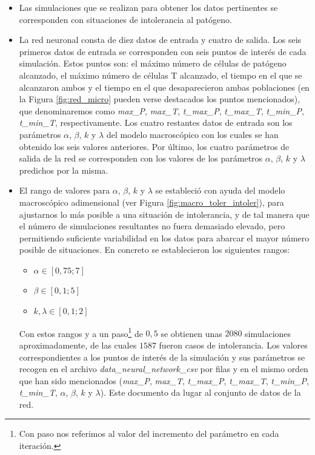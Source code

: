 \begin{itemize}
	\item Las simulaciones que se realizan para obtener los datos pertinentes se corresponden con situaciones de intolerancia al patógeno.
	
	\item La red neuronal consta de diez datos de entrada y cuatro de salida. Los seis primeros datos de entrada se corresponden con seis puntos de interés de cada simulación. Estos puntos son: el máximo número de células de patógeno alcanzado, el máximo número de células T alcanzado, el tiempo en el que se alcanzaron ambos y el tiempo en el que desaparecieron ambas poblaciones (en la Figura \ref{fig:red_micro} pueden verse destacados los puntos mencionados), que denominaremos como \textit{max\_P}, \textit{max\_T}, \textit{t\_max\_P}, \textit{t\_max\_T}, \textit{t\_min\_P}, \textit{t\_min\_T}, respectivamente. Los cuatro restantes datos de entrada son los parámetros $\alpha$, $\beta$, $k$ y $\lambda$ del modelo macroscópico con los cuales se han obtenido los seis valores anteriores. Por último, los cuatro parámetros de salida de la red se corresponden con los valores de los parámetros $\alpha$, $\beta$, $k$ y $\lambda$ predichos por la misma.
	
	\item El rango de valores para $\alpha$, $\beta$, $k$ y $\lambda$ se estableció con ayuda del modelo macroscópico adimensional (ver Figura \ref{fig:macro_toler_intoler}), para ajustarnos lo más posible a una situación de intolerancia, y de tal manera que el número de simulaciones resultantes no fuera demasiado elevado, pero permitiendo suficiente variabilidad en los datos para abarcar el mayor número posible de situaciones. En concreto se establecieron los siguientes rangos:
	
	\begin{itemize}
		\item $\alpha \in  [0,75;7]$
		\item $\beta \in [0,1;5]$
		\item $k, \lambda \in [0,1;2]$
	\end{itemize}
	
	Con estos rangos y a un paso\footnote{Con paso nos referimos al valor del incremento del parámetro en cada iteración.} de $0,5$ se obtienen unas $2080$ simulaciones aproximadamente, de las cuales $1587$ fueron casos de intolerancia. Los valores correspondientes a los puntos de interés de la simulación y sus parámetros se recogen en el archivo \textit{data\_neural\_network\_csv} por filas y en el mismo orden que han sido mencionados (\textit{max\_P}, \textit{max\_T}, \textit{t\_max\_P}, \textit{t\_max\_T}, \textit{t\_min\_P}, \textit{t\_min\_T}, $\alpha$, $\beta$, $k$ y $\lambda$). Este documento da lugar al conjunto de datos de la red.
	

\end{itemize}
